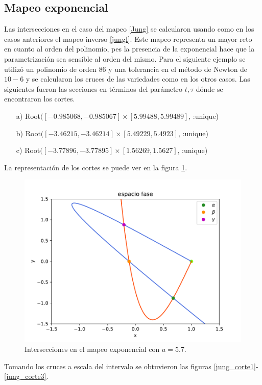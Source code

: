 \subsection{Mapeo exponencial}
Las intersecciones en el caso del mapeo \eqref{Jung} se calcularon usando como en los casos anteriores el mapeo inverso \eqref{jungI}. Este mapeo representa un mayor reto en cuanto al orden del polinomio, pes la presencia de la exponencial hace que la parametrización sea sensible al orden del mismo. Para el siguiente ejemplo se utilizó un polinomio de orden 86 y una tolerancia en el método de Newton de $10-6$ y se calcularon los cruces de las variedades como en los otros casos. Las siguientes fueron las secciones en términos del parámetro $t,\tau$ dónde se encontraron los cortes. 
\begin{itemize}
\item[a)] Root$([-0.985068, -0.985067] \times [5.99488, 5.99489]$, :unique)
\item[b)] Root$([-3.46215, -3.46214] \times [5.49229, 5.4923]$, :unique)
\item[c)] Root$([-3.77896, -3.77895] \times [1.56269, 1.5627]$, :unique)
\end{itemize}
La representación de los cortes se puede ver en la figura \ref{jung_cortes}.
\begin{figure}[H]
\centering
\includegraphics[scale=0.5]{cruces_jung1}
\caption{Intersecciones en el mapeo exponencial con $a=5.7$.}
\label{jung_cortes}
\end{figure}

Tomando los cruces a escala del intervalo se obtuvieron las figuras \ref{jung_corte1}-\ref{jung_corte3}.

